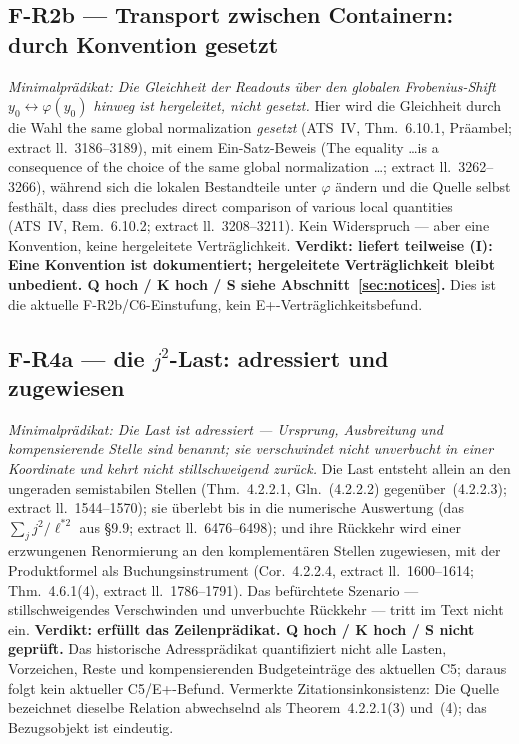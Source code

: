 \documentclass[11pt,a4paper]{article}
\begin{document}
\subsection{F-R2b --- Transport zwischen Containern: durch Konvention gesetzt}\label{sec:r2b}

\emph{Minimalprädikat: Die Gleichheit der Readouts über den globalen
Frobenius-Shift $y_0 \leftrightarrow \varphi(y_0)$ hinweg ist hergeleitet,
nicht gesetzt.} Hier wird die Gleichheit durch die Wahl \glqq the same global
normalization\grqq{} \emph{gesetzt} (ATS~IV, Thm.~6.10.1, Präambel; extract
ll.~3186--3189), mit einem Ein-Satz-Beweis (\glqq The equality \dots is a
consequence of the choice of the same global normalization \dots\grqq{}; extract
ll.~3262--3266), während sich die lokalen Bestandteile unter $\varphi$ ändern
und die Quelle selbst festhält, dass dies \glqq precludes direct comparison of
various local quantities\grqq{} (ATS~IV, Rem.~6.10.2; extract ll.~3208--3211). Kein
Widerspruch --- aber eine Konvention, keine hergeleitete Verträglichkeit.
\textbf{Verdikt: liefert teilweise (I): Eine Konvention ist dokumentiert;
hergeleitete Verträglichkeit bleibt unbedient. Q hoch / K hoch / S siehe
Abschnitt~\ref{sec:notices}.} Dies ist die aktuelle F-R2b/C6-Einstufung,
kein E+-Verträglichkeitsbefund.

\subsection{F-R4a --- die \texorpdfstring{$j^2$}{j\texttwosuperior}-Last: adressiert und zugewiesen}\label{sec:r4a}

\emph{Minimalprädikat: Die Last ist adressiert --- Ursprung, Ausbreitung und
kompensierende Stelle sind benannt; sie verschwindet nicht unverbucht in einer
Koordinate und kehrt nicht stillschweigend zurück.} Die Last entsteht allein an
den ungeraden semistabilen Stellen (Thm.~4.2.2.1, Gln.~(4.2.2.2)
gegenüber~(4.2.2.3); extract ll.~1544--1570); sie überlebt bis in die
numerische Auswertung (das $\sum_j j^2/\ell^{*2}$ aus \S9.9; extract
ll.~6476--6498); und ihre Rückkehr wird einer erzwungenen Renormierung an den
komplementären Stellen zugewiesen, mit der Produktformel als
Buchungsinstrument (Cor.~4.2.2.4, extract ll.~1600--1614; Thm.~4.6.1(4),
extract ll.~1786--1791). Das befürchtete Szenario --- stillschweigendes
Verschwinden und unverbuchte Rückkehr --- tritt im Text nicht ein.
\textbf{Verdikt: erfüllt das Zeilenprädikat. Q hoch / K hoch / S nicht
geprüft.}
Das historische Adressprädikat quantifiziert nicht alle Lasten,
Vorzeichen, Reste und kompensierenden Budgeteinträge des aktuellen C5;
daraus folgt kein aktueller C5/E+-Befund. Vermerkte Zitationsinkonsistenz: Die Quelle bezeichnet dieselbe Relation
abwechselnd als Theorem~4.2.2.1(3) und~(4); das Bezugsobjekt ist eindeutig.
\end{document}
